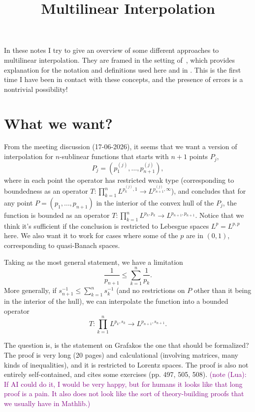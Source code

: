 \documentclass[b5paper]{article}
\title{Multilinear Interpolation}
\newcommand\todo[1]{\textcolor{purple}{#1}}
\begin{document}
\maketitle


In these notes I try to give an overview of some different approaches to multilinear interpolation. They are framed in the setting of~\cite[Chapter 2]{berghInterpolationSpacesIntroduction2003}, which provides explanation for the notation and definitions used here and in \cite{jansonInterpolationMultilinearOperators1988}. This is the first time I have been in contact with these concepts, and the presence of errors is a nontrivial possibility!

\tableofcontents

\section{What we want?}

From the meeting discussion (17-06-2026), it seems that we want a version of  interpolation for \(n\)-sublinear functions that starts with \(n + 1\) points \(P_j\), \[P_j = (p_1^{(j)},\dots,p_{n + 1}^{(j)}),\] where in each point the operator has restricted weak type   (corresponding to boundedness as an operator \(T \colon \prod_{k = 1}^n L^{p_k^{(j)},1} \to L^{p_{n + 1}^{(j)},\infty}\)), and concludes that for any point \(P = (p_1,\dots,p_{n + 1})\) in the interior of the convex hull of the \(P_j\), the function is bounded as an operator \(T\colon \prod_{k = 1}^n L^{p_k,p_k} \to L^{p_{n + 1},p_{n + 1}}\). Notice that we think it's sufficient if the conclusion is restricted to Lebesgue spaces \(L^p = L^{p,p}\) here. We also want it to work for cases where some of the \(p\) are in \((0,1)\), corresponding to quasi-Banach spaces.

Taking \cite[Theorem 7.2.2]{grafakosModernFourierAnalysis2014} as the most general statement, we have a limitation
\begin{equation*}
  \frac{1}{p_{n + 1}} \le \sum_{k = 1}^n \frac{1}{p_k}.
\end{equation*}
More generally, if \(s_{n + 1} ^{-1} \le \sum_{k = 1}^n s_k^{-1}\) (and no restrictions on \(P\) other than it being in the interior of the hull), we can interpolate the function into a bounded operator
\[T\colon \prod_{k = 1}^n L^{p_k,s_k} \to L^{p_{n + 1},s_{n + 1}}.\]

The question is, is the statement on Grafakos the one that should be formalized? The proof is very long (20 pages) and calculational (involving matrices, many kinds of inequalities), and it is restricted to Lorentz spaces. The proof is also not entirely self-contained, and cites some exercises (pp. 497, 505, 508). \todo{(note (Lua): If AI could do it, I would be very happy, but for humans it looks like that long proof is a pain. It also does not look like the sort of theory-building proofs that we usually have in Mathlib.)}
\end{document}

